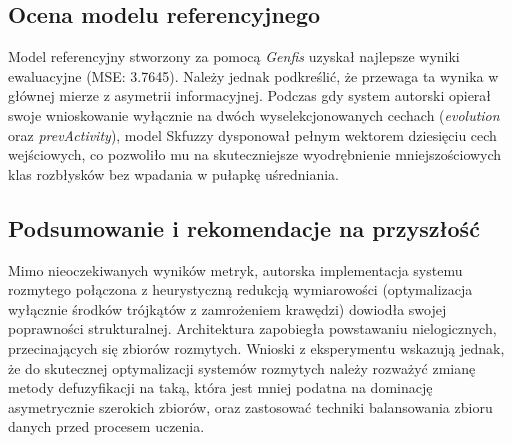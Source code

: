 \documentclass[12pt, a4paper]{article}
\begin{document}
\subsection{Ocena modelu referencyjnego}
Model referencyjny stworzony za pomocą \textit{Genfis} uzyskał najlepsze wyniki ewaluacyjne (MSE: 3.7645). Należy jednak podkreślić, że przewaga ta wynika w głównej mierze z asymetrii informacyjnej. Podczas gdy system autorski opierał swoje wnioskowanie wyłącznie na dwóch wyselekcjonowanych cechach (\textit{evolution} oraz \textit{prevActivity}), model Skfuzzy dysponował pełnym wektorem dziesięciu cech wejściowych, co pozwoliło mu na skuteczniejsze wyodrębnienie mniejszościowych klas rozbłysków bez wpadania w pułapkę uśredniania.

\subsection{Podsumowanie i rekomendacje na przyszłość}
Mimo nieoczekiwanych wyników metryk, autorska implementacja systemu rozmytego połączona z heurystyczną redukcją wymiarowości (optymalizacja wyłącznie środków trójkątów z zamrożeniem krawędzi) dowiodła swojej poprawności strukturalnej. Architektura zapobiegła powstawaniu nielogicznych, przecinających się zbiorów rozmytych. Wnioski z eksperymentu wskazują jednak, że do skutecznej optymalizacji systemów rozmytych należy rozważyć zmianę metody defuzyfikacji na taką, która jest mniej podatna na dominację asymetrycznie szerokich zbiorów, oraz zastosować techniki balansowania zbioru danych przed procesem uczenia.
\end{document}
